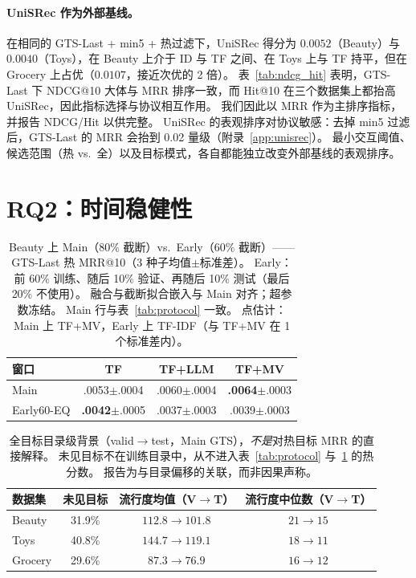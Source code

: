 \documentclass[sigconf,natbib=true,anonymous]{acmart}
\newcommand{\tfidf}{\textsc{TF-IDF}\xspace}
\newcommand{\tfmv}{\textsc{TF+MV}\xspace}
\begin{document}
\paragraph{UniSRec 作为外部基线。}
在相同的 GTS-Last + min5 + 热过滤下，UniSRec 得分为 $0.0052$（Beauty）与 $0.0040$（Toys），在 Beauty 上介于 ID 与 TF 之间、在 Toys 上与 TF 持平，但在 Grocery 上占优（$0.0107$，接近次优的 2 倍）。
表~\ref{tab:ndcg_hit} 表明，GTS-Last 下 NDCG@10 大体与 MRR 排序一致，而 Hit@10 在三个数据集上都抬高 UniSRec，因此指标选择与协议相互作用。
我们因此以 MRR 作为主排序指标，并报告 NDCG/Hit 以供完整。
UniSRec 的表观排序对协议敏感：去掉 min5 过滤后，GTS-Last 的 MRR 会抬到 0.02 量级（附录~\ref{app:unisrec}）。
最小交互阈值、候选范围（热 vs.\ 全）以及目标模式，各自都能独立改变外部基线的表观排序。

\section{RQ2：时间稳健性}
\label{sec:rq2}

\begin{table}[t]
\centering
\caption{%
Beauty 上 Main（$80\%$ 截断）vs.\ Early（$60\%$ 截断）——GTS-Last 热 MRR@10（3 种子均值$\pm$标准差）。
Early：前 60\% 训练、随后 10\% 验证、再随后 10\% 测试（最后 20\% 不使用）。
融合与截断拟合嵌入与 Main 对齐；超参数冻结。
Main 行与表~\ref{tab:protocol} 一致。
点估计：Main 上 \tfmv，Early 上 \tfidf（与 \tfmv 在 1 个标准差内）。%
}
\label{tab:early}
\small
\begin{tabular}{@{}lccc@{}}
\toprule
窗口 & TF & TF+LLM & TF+MV \\
\midrule
Main      & .0053\tiny{$\pm$.0004} & .0060\tiny{$\pm$.0004} & \textbf{.0064}\tiny{$\pm$.0003} \\
Early60-EQ & \textbf{.0042}\tiny{$\pm$.0005} & .0037\tiny{$\pm$.0003} & .0039\tiny{$\pm$.0003} \\
\bottomrule
\end{tabular}
\end{table}

\begin{table}[t]
\centering
\caption{%
全目标目录级背景（valid$\to$test，Main GTS），\emph{不是}对热目标 MRR 的直接解释。
未见目标不在训练目录中，从不进入表~\ref{tab:protocol} 与~\ref{tab:early} 的热分数。
报告为与目录偏移的关联，而非因果声称。%
}
\label{tab:shift}
\small
\setlength{\tabcolsep}{4pt}
\begin{tabular}{@{}lccc@{}}
\toprule
数据集 & 未见目标 & 流行度均值（V$\to$T） & 流行度中位数（V$\to$T） \\
\midrule
Beauty  & 31.9\% & $112.8 \to 101.8$ & $21 \to 15$ \\
Toys    & 40.8\% & $144.7 \to 119.1$ & $18 \to 11$ \\
Grocery & 29.6\% & $87.3 \to 76.9$ & $16 \to 12$ \\
\bottomrule
\end{tabular}
\end{table}
\end{document}

